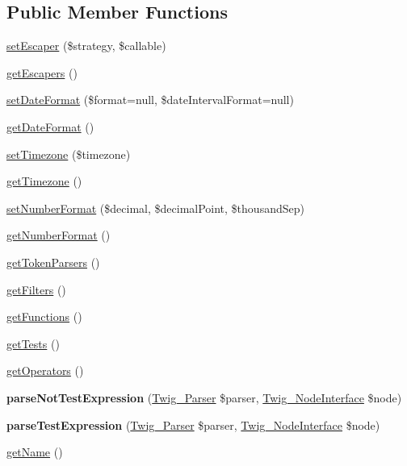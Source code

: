 \subsection*{Public Member Functions}
\begin{DoxyCompactItemize}
\item 
\hyperlink{class_twig___extension___core_ab8c5bf7d560b39ae420e3131d6cc64c4}{set\+Escaper} (\$strategy, \$callable)
\item 
\hyperlink{class_twig___extension___core_a98b08ee8d76d2e8b51f88aadf54c57f3}{get\+Escapers} ()
\item 
\hyperlink{class_twig___extension___core_a918c0c32f566071adc9b5258a2ab6fca}{set\+Date\+Format} (\$format=null, \$date\+Interval\+Format=null)
\item 
\hyperlink{class_twig___extension___core_ac8d28832fbeea9d3a9e4e591c9af4c93}{get\+Date\+Format} ()
\item 
\hyperlink{class_twig___extension___core_ac1b4cf4ebad277081311189dffb821f2}{set\+Timezone} (\$timezone)
\item 
\hyperlink{class_twig___extension___core_a23e87a365ef1aea5bc5fdad51d8925ae}{get\+Timezone} ()
\item 
\hyperlink{class_twig___extension___core_a10cf675b0b6476d7a25fbcaa40206fa0}{set\+Number\+Format} (\$decimal, \$decimal\+Point, \$thousand\+Sep)
\item 
\hyperlink{class_twig___extension___core_a7ac6ceb09817aef826280cdbad8bb3a8}{get\+Number\+Format} ()
\item 
\hyperlink{class_twig___extension___core_a8fd35903c3d01c0f0078f59d142eb063}{get\+Token\+Parsers} ()
\item 
\hyperlink{class_twig___extension___core_a428d91319fc73d3038784cf5436936b6}{get\+Filters} ()
\item 
\hyperlink{class_twig___extension___core_a131c2522f07821f77cd1d038c216031b}{get\+Functions} ()
\item 
\hyperlink{class_twig___extension___core_a7e247dd31cc8d37a6c97353a062a0080}{get\+Tests} ()
\item 
\hyperlink{class_twig___extension___core_aeaf58da661970280d00b67c17dc4f8d4}{get\+Operators} ()
\item 
\hypertarget{class_twig___extension___core_aa5aa08c4d358ee4f05807171b0f0dfa6}{}{\bfseries parse\+Not\+Test\+Expression} (\hyperlink{class_twig___parser}{Twig\+\_\+\+Parser} \$parser, \hyperlink{interface_twig___node_interface}{Twig\+\_\+\+Node\+Interface} \$node)\label{class_twig___extension___core_aa5aa08c4d358ee4f05807171b0f0dfa6}

\item 
\hypertarget{class_twig___extension___core_a78fa1e8423be18294d6c15308ca4c9da}{}{\bfseries parse\+Test\+Expression} (\hyperlink{class_twig___parser}{Twig\+\_\+\+Parser} \$parser, \hyperlink{interface_twig___node_interface}{Twig\+\_\+\+Node\+Interface} \$node)\label{class_twig___extension___core_a78fa1e8423be18294d6c15308ca4c9da}

\item 
\hyperlink{class_twig___extension___core_a3d0963e68bb313b163a73f2803c64600}{get\+Name} ()
\end{DoxyCompactItemize}
